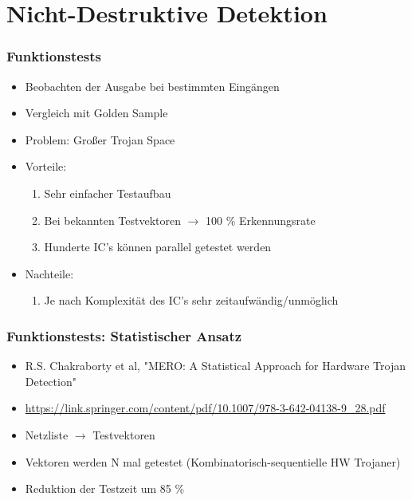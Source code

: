 \documentclass[11pt]{beamer}
\begin{document}
\section{Nicht-Destruktive Detektion}
\begin{frame}
    \frametitle{Funktionstests}
    \begin{itemize}
        \item Beobachten der Ausgabe bei bestimmten Eingängen
        \item Vergleich mit Golden Sample
        \item Problem: Großer Trojan Space
        \item Vorteile:
        \begin{enumerate}
            \item Sehr einfacher Testaufbau
            \item Bei bekannten Testvektoren $\rightarrow$ 100 \% Erkennungsrate
            \item Hunderte IC's können parallel getestet werden
        \end{enumerate}
        \item Nachteile:
        \begin{enumerate}
            \item Je nach Komplexität des IC's sehr zeitaufwändig/unmöglich
        \end{enumerate}
    \end{itemize}
\end{frame}
\begin{frame}
    \frametitle{Funktionstests: Statistischer Ansatz}
    \begin{itemize}
        \item R.S. Chakraborty et al, "MERO: A Statistical Approach for Hardware Trojan Detection"
        \item \url{https://link.springer.com/content/pdf/10.1007/978-3-642-04138-9_28.pdf}
        \item Netzliste $\rightarrow$ Testvektoren
        \item Vektoren werden N mal getestet (Kombinatorisch-sequentielle HW Trojaner)
        \item Reduktion der Testzeit um 85 \%
    \end{itemize}
\end{frame}
\end{document}
